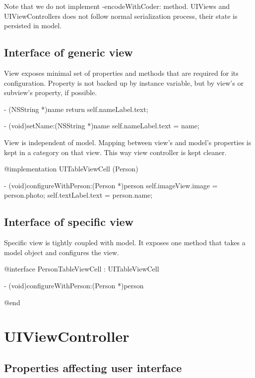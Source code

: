 \documentclass[10pt]{extarticle}
\newenvironment{codelisting}
{\footnotesize\mdframed[middlelinewidth=0.5pt, middlelinecolor=BaliHaiColor, skipabove=15pt]\verbatim}
{\endverbatim\endmdframed\vspace{12pt}\normalsize}
\begin{document}
Note that we do not implement -encodeWithCoder: method. UIViews and UIViewControllers does not follow normal serialization process, their state is persisted in model.


\subsection{Interface of generic view}

View exposes minimal set of properties and methods that are required for its configuration.
Property is not backed up by instance variable, but by view's or subview's property, if possible.

\begin{codelisting}
- (NSString *)name
{
    return self.nameLabel.text;
}

- (void)setName:(NSString *)name
{
    self.nameLabel.text = name;
}
\end{codelisting}

View is independent of model. Mapping between view's and model's properties is kept in a category on that view. This way view controller is kept cleaner.

\begin{codelisting}
@implementation UITableViewCell (Person)

- (void)configureWithPerson:(Person *)person
{
    self.imageView.image = person.photo;
    self.textLabel.text = person.name;
}
\end{codelisting}


\subsection{Interface of specific view}

Specific view is tightly coupled with model. It exposes one method that takes a model object and configures the view.

\begin{codelisting}
@interface PersonTableViewCell : UITableViewCell

- (void)configureWithPerson:(Person *)person

@end
\end{codelisting}


\section{UIViewController}

\subsection{Properties affecting user interface}
\end{document}
